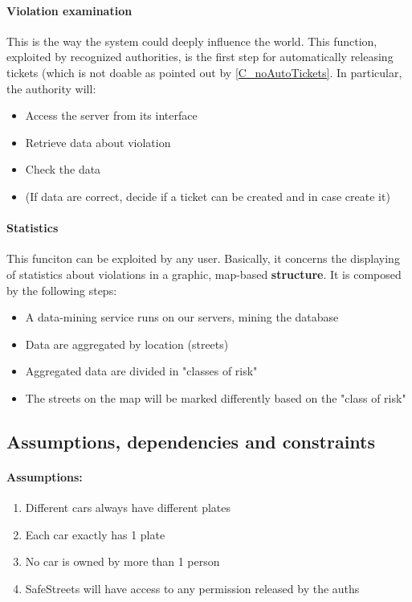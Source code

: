\documentclass{article}
\newcommand{\enum}[1]{\texttt{#1.\arabic*}}
\begin{document}
		\paragraph{Violation examination}
			This is the way the system could deeply influence the world. This function, exploited by recognized authorities, is the first step for automatically releasing tickets (which is not doable as pointed out by \ref{C_noAutoTickets}. In particular, the authority will:
			\begin{itemize}
				\item Access the server from its interface
				\item Retrieve data about violation
				\item Check the data
				\item (If data are correct, decide if a ticket can be created and in case create it)
			\end{itemize}
		\paragraph{Statistics}
			This funciton can be exploited by any user. Basically, it concerns the displaying of statistics about violations in a graphic, map-based \textbf{structure}. It is composed by the following steps:
			\begin{itemize}
				\item A data-mining service runs on our servers, mining the database
				\item Data are aggregated by location (streets)
				\item Aggregated data are divided in "classes of risk"
				\item The streets on the map will be marked differently based on the "class of risk"
			\end{itemize}
			
	
	\subsection{Assumptions, dependencies and constraints}
	
	\paragraph{Assumptions:}
		\begin{enumerate}[label=\enum{A}]
			\item \label{A_disjPlates} Different cars always have different plates
			\item \label{A_Single plate}Each car exactly has 1 plate
			\item \label{A_singleOwner}No car is owned by more than 1 person
			\item \label{A_accessiblePermissions}SafeStreets will have access to any permission released by the auths
		\end{enumerate}
	
\end{document}
